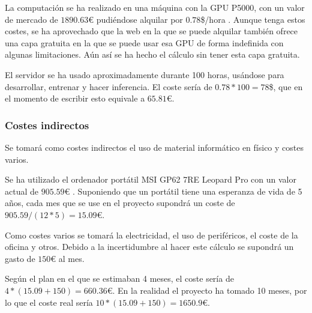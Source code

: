 La computación se ha realizado en una máquina con la GPU P5000, con un valor de mercado de $1890.63$€ \cite{amazonp5000} pudiéndose alquilar por $0.78$\$/hora \cite{gradientdocs}. Aunque tenga estos costes, se ha aprovechado que la web en la que se puede alquilar también ofrece una capa gratuita en la que se puede usar esa GPU de forma indefinida con algunas limitaciones. Aún así se ha hecho el cálculo sin tener esta capa gratuita.

El servidor se ha usado aproximadamente durante 100 horas, usándose para desarrollar, entrenar y hacer inferencia. El coste sería de $0.78 * 100 = 78$\$, que en el momento de escribir esto equivale a $65.81$€.

\subsubsection{Costes indirectos}\label{sec:costesindirectos}

Se tomará como costes indirectos el uso de material informático en físico y costes varios.

Se ha utilizado el ordenador portátil MSI GP62 7RE Leopard Pro con un valor actual de $905.59$€ \cite{pccomponentes}. Suponiendo que un portátil tiene una esperanza de vida de 5 años, cada mes que se use en el proyecto supondrá un coste de $905.59 / (12*5) = 15.09$€.

Como costes varios se tomará la electricidad, el uso de periféricos, el coste de la oficina y otros. Debido a la incertidumbre al hacer este cálculo se supondrá un gasto de $150$€ al mes.

Según el plan en el que se estimaban 4 meses, el coste sería de $4 * (15.09 + 150) = 660.36$€. En la realidad el proyecto ha tomado 10 meses, por lo que el coste real sería $10 * (15.09 + 150) = 1650.9$€.
